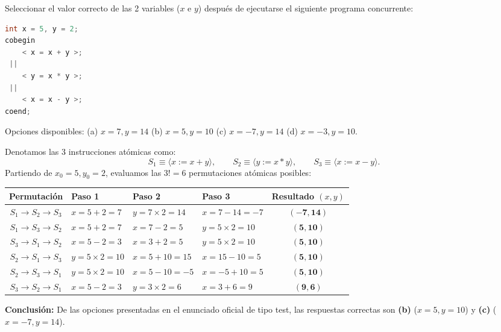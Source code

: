 \begin{ejercicio}
Seleccionar el valor correcto de las 2 variables ($x$ e $y$) después de ejecutarse el siguiente programa concurrente:
\begin{lstlisting}[language=C++]
int x = 5, y = 2;
cobegin
    < x = x + y >;
 ||
    < y = x * y >;
 ||
    < x = x - y >;
coend;
\end{lstlisting}
Opciones disponibles:
(a) $x = 7, y = 14$ \qquad (b) $x = 5, y = 10$ \qquad (c) $x = -7, y = 14$ \qquad (d) $x = -3, y = 10$.
\end{ejercicio}

\begin{solucion}
Denotamos las 3 instrucciones atómicas como:
\[
S_1 \equiv \langle x := x + y \rangle, \qquad S_2 \equiv \langle y := x * y \rangle, \qquad S_3 \equiv \langle x := x - y \rangle.
\]
Partiendo de $x_0 = 5, y_0 = 2$, evaluamos las $3! = 6$ permutaciones atómicas posibles:

\begin{center}
\footnotesize
\setlength{\tabcolsep}{4.5pt}
\begin{tabular}{clllc}
\toprule
\textbf{Permutación} & \textbf{Paso 1} & \textbf{Paso 2} & \textbf{Paso 3} & \textbf{Resultado $(x, y)$} \\ \midrule
$S_1 \to S_2 \to S_3$ & $x = 5+2 = 7$ & $y = 7 \times 2 = 14$ & $x = 7 - 14 = -7$ & $\mathbf{(-7, 14)}$ \quad [Opción c] \\
$S_1 \to S_3 \to S_2$ & $x = 5+2 = 7$ & $x = 7 - 2 = 5$ & $y = 5 \times 2 = 10$ & $\mathbf{(5, 10)}$ \quad [Opción b] \\
$S_3 \to S_1 \to S_2$ & $x = 5-2 = 3$ & $x = 3 + 2 = 5$ & $y = 5 \times 2 = 10$ & $\mathbf{(5, 10)}$ \quad [Opción b] \\
$S_2 \to S_1 \to S_3$ & $y = 5 \times 2 = 10$ & $x = 5 + 10 = 15$ & $x = 15 - 10 = 5$ & $\mathbf{(5, 10)}$ \quad [Opción b] \\
$S_2 \to S_3 \to S_1$ & $y = 5 \times 2 = 10$ & $x = 5 - 10 = -5$ & $x = -5 + 10 = 5$ & $\mathbf{(5, 10)}$ \quad [Opción b] \\
$S_3 \to S_2 \to S_1$ & $x = 5-2 = 3$ & $y = 3 \times 2 = 6$ & $x = 3 + 6 = 9$ & $\mathbf{(9, 6)}$ \\ \bottomrule
\end{tabular}
\end{center}

\textbf{Conclusión:} De las opciones presentadas en el enunciado oficial de tipo test, las respuestas correctas son \textbf{(b)} ($x = 5, y = 10$) y \textbf{(c)} ($x = -7, y = 14$).
\end{solucion}

